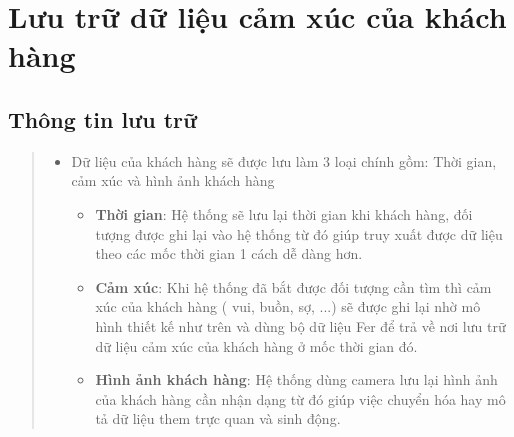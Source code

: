 \documentclass{article}
\begin{document}
\section{Lưu trữ dữ liệu cảm xúc của khách hàng}
\subsection{Thông tin lưu trữ}
\begin{quote}
\begin{itemize}
   \item  Dữ liệu của khách hàng sẽ được lưu làm 3 loại chính gồm: Thời gian, cảm xúc và hình ảnh khách hàng
   \begin{itemize}
      \item \textbf{Thời gian}: Hệ thống sẽ lưu lại thời gian khi khách hàng, đối tượng được ghi lại vào hệ thống từ đó giúp truy xuất được dữ liệu theo các mốc thời gian 1 cách dễ dàng hơn. 
      \item \textbf{Cảm xúc}: Khi hệ thống đã bắt được đối tượng cần tìm thì cảm xúc của khách hàng ( vui, buồn, sợ, ...) sẽ được ghi lại nhờ mô hình thiết kế như trên và dùng bộ dữ liệu Fer để trả về nơi lưu trữ dữ liệu cảm xúc của khách hàng ở mốc thời gian đó. 
      \item \textbf{Hình ảnh khách hàng}: Hệ thống dùng camera lưu lại hình ảnh của khách hàng cần nhận dạng từ đó giúp việc chuyển hóa hay mô tả dữ liệu them trực quan và sinh động.
   \end{itemize}
\end{itemize}
\end{quote}
\end{document}
